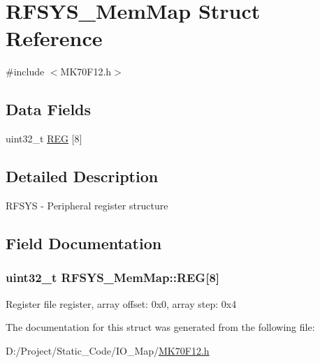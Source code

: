 \hypertarget{struct_r_f_s_y_s___mem_map}{}\section{R\+F\+S\+Y\+S\+\_\+\+Mem\+Map Struct Reference}
\label{struct_r_f_s_y_s___mem_map}


{\ttfamily \#include $<$M\+K70\+F12.\+h$>$}

\subsection*{Data Fields}
\begin{DoxyCompactItemize}
\item 
uint32\+\_\+t \hyperlink{struct_r_f_s_y_s___mem_map_a9ecc7686e575e2e1570cf50aa3234276}{R\+E\+G} \mbox{[}8\mbox{]}
\end{DoxyCompactItemize}


\subsection{Detailed Description}
R\+F\+S\+Y\+S -\/ Peripheral register structure 

\subsection{Field Documentation}
\hypertarget{struct_r_f_s_y_s___mem_map_a9ecc7686e575e2e1570cf50aa3234276}{}
\subsubsection[{R\+E\+G}]{\setlength{\rightskip}{0pt plus 5cm}uint32\+\_\+t R\+F\+S\+Y\+S\+\_\+\+Mem\+Map\+::\+R\+E\+G\mbox{[}8\mbox{]}}\label{struct_r_f_s_y_s___mem_map_a9ecc7686e575e2e1570cf50aa3234276}
Register file register, array offset\+: 0x0, array step\+: 0x4 

The documentation for this struct was generated from the following file\+:\begin{DoxyCompactItemize}
\item 
D\+:/\+Project/\+Static\+\_\+\+Code/\+I\+O\+\_\+\+Map/\hyperlink{_m_k70_f12_8h}{M\+K70\+F12.\+h}\end{DoxyCompactItemize}

